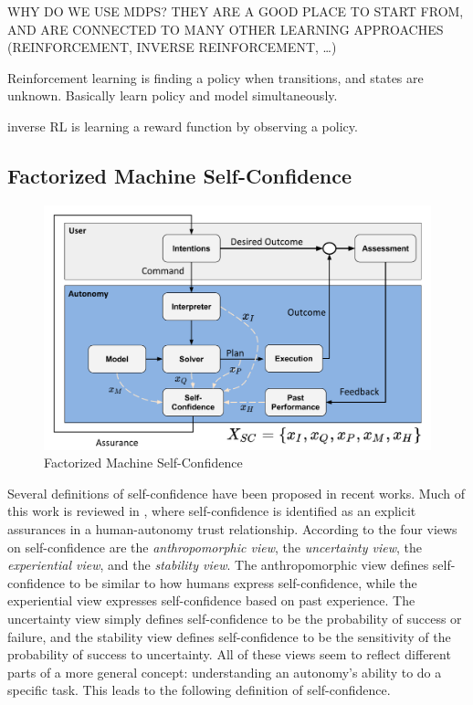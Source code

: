     WHY DO WE USE MDPS? THEY ARE A GOOD PLACE TO START FROM, AND ARE CONNECTED TO MANY OTHER LEARNING APPROACHES (REINFORCEMENT, INVERSE REINFORCEMENT, \ldots)

    Reinforcement learning is finding a policy when transitions, and states are unknown. Basically learn policy and model simultaneously.

    inverse RL is learning a reward function by observing a policy.

\subsection{Factorized Machine Self-Confidence}
    \begin{figure}[tbp]
        \centering
        \includegraphics[width=0.65\linewidth]{Figures/SC_flowchart.pdf}
        \caption{Factorized Machine Self-Confidence}
        \label{fig:famsec}
    \end{figure}

    Several definitions of self-confidence have been proposed in recent works. Much of this work is reviewed in \cite{Israelsen2017-ym}, where self-confidence is identified as an explicit assurances in a human-autonomy trust relationship. According to \cite{Sweet2016-tz} the four views on self-confidence are the \textit{anthropomorphic view}, the \textit{uncertainty view}, the \textit{experiential view}, and the \textit{stability view}. The anthropomorphic view defines self-confidence to be similar to how humans express self-confidence, while the experiential view expresses self-confidence based on past experience. The uncertainty view simply defines self-confidence to be the probability of success or failure, and the stability view defines self-confidence to be the sensitivity of the probability of success to uncertainty. All of these views seem to reflect different parts of a more general concept: understanding an autonomy's ability to do a specific task. This leads to the following definition of self-confidence.

